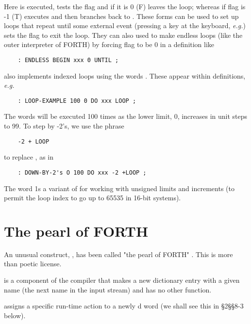 Here  is executed,  tests the ﬂag and if it is 0 (F) leaves the loop; whereas if flag is -1 (T)  executes  and  then branches back to . These forms can be used to set up loops that repeat until some external event (pressing a key at the keyboard, \textit{e.g.}) sets the ﬂag to exit the loop. They can also used to make endless loops (like the outer interpreter of FORTH) by forcing flag to be 0 in a definition like

\begin{lstlisting}
    : ENDLESS BEGIN xxx 0 UNTIL ;
\end{lstlisting}

 also implements indexed loops using the words . These appear within definitions, \textit{e.g.}

\begin{lstlisting}
    : LOOP-EXAMPLE 100 0 DO xxx LOOP ;
\end{lstlisting}

The words  will be executed 100 times as the lower limit, 0, increases in unit steps to 99. To step by -2's, we use the phrase

\begin{lstlisting}
    -2 + LOOP
\end{lstlisting}

to replace , as in

\begin{lstlisting}
    : DOWN-BY-2's O 100 DO xxx -2 +LOOP ;
\end{lstlisting}

The word  1s a variant of  for working with unsigned limits and increments (to permit the loop index to go up to 65535 in 16-bit systems).

\section{The pearl of FORTH}

An unusual construct, , has been called "the pearl of FORTH" . This is more than poetic license.

 is a component of the compiler that makes a new dictionary entry with a given name (the next name in the input stream) and has no other function.

 assigns a specific run-time action to a newly d word (we shall see this in \S2\S\S8-3 below).

